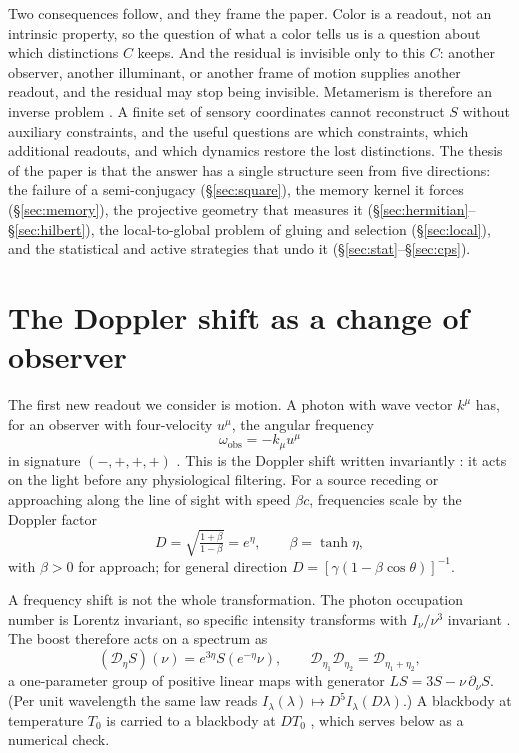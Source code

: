 \documentclass[11pt]{article}
\theoremstyle{boldplain}
\theoremstyle{boldupright}
\newcommand{\Dop}{\mathcal{D}}
\begin{document}
Two consequences follow, and they frame the paper. Color is a readout, not an intrinsic property,
so the question of what a color tells us is a question about which distinctions $C$ keeps. And the
residual is invisible only to this $C$: another observer, another illuminant, or another frame of motion
supplies another readout, and the residual may stop being invisible. Metamerism is therefore an
inverse problem \cite{cohen1982,maloney1986}. A finite set of sensory coordinates cannot reconstruct $S$ without auxiliary
constraints, and the useful questions are which constraints, which additional readouts, and which
dynamics restore the lost distinctions. The thesis of the paper is that the answer has a single
structure seen from five directions: the failure of a semi-conjugacy (\S\ref{sec:square}), the memory kernel it forces
(\S\ref{sec:memory}), the projective geometry that measures it (\S\ref{sec:hermitian}--\S\ref{sec:hilbert}), the local-to-global problem of gluing and
selection (\S\ref{sec:local}), and the statistical and active strategies that
undo it (\S\ref{sec:stat}--\S\ref{sec:cps}).

\section{The Doppler shift as a change of observer}\label{sec:doppler}

The first new readout we consider is motion. A photon with wave vector $k^\mu$ has, for an observer
with four-velocity $u^\mu$, the angular frequency
\begin{equation}\label{eq:omega}
\omega_{\mathrm{obs}}=-k_\mu u^\mu
\end{equation}
in signature $(-,+,+,+)$ \cite{mtw1973}. This is the Doppler shift written invariantly \cite{einstein1905}: it acts on the light
before any physiological filtering. For a source receding or approaching along the line of sight with
speed $\beta c$, frequencies scale by the Doppler factor
\begin{equation}\label{eq:doppler}
D=\sqrt{\tfrac{1+\beta}{1-\beta}}=e^{\eta},\qquad \beta=\tanh\eta,
\end{equation}
with $\beta>0$ for approach; for general direction $D=[\gamma(1-\beta\cos\theta)]^{-1}$.

A frequency shift is not the whole transformation. The photon occupation number is Lorentz
invariant, so specific intensity transforms with $I_\nu/\nu^3$ invariant \cite{rybicki1979}. The boost therefore acts on a
spectrum as
\begin{equation}\label{eq:boost}
(\Dop_\eta S)(\nu)=e^{3\eta}S(e^{-\eta}\nu),\qquad \Dop_{\eta_1}\Dop_{\eta_2}=\Dop_{\eta_1+\eta_2},
\end{equation}
a one-parameter group of positive linear maps with generator $LS=3S-\nu\,\partial_\nu S$. (Per unit wavelength
the same law reads $I_\lambda(\lambda)\mapsto D^5I_\lambda(D\lambda)$.) A blackbody at temperature $T_0$ is carried to a blackbody
at $DT_0$ \cite{peebles1968}, which serves below as a numerical check.
\end{document}
